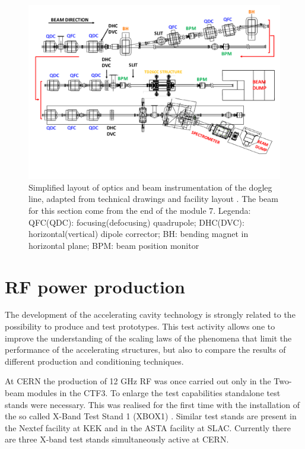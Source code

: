 \begin{landscape}
\begin{figure}
\centering 
\includegraphics[scale=0.78]{pictures/modified_pets.pdf}
\caption{Simplified layout of optics and beam instrumentation of the dogleg line, adapted from technical drawings and facility layout \cite{EDMS:CTF3}. The beam for this section come from the end of the module 7. Legenda: QFC(QDC): focusing(defocusing) quadrupole; DHC(DVC): horizontal(vertical) dipole corrector; BH: bending magnet in horizontal plane; BPM: beam position monitor}
\label{dolaut}
\end{figure}
\end{landscape}



\section[RF power production]{RF power production}

The development of the accelerating cavity technology is strongly related to the possibility to produce and test prototypes. This test activity allows one to improve the understanding of the scaling laws of the phenomena that limit the performance of the accelerating structures, but also to compare the results of different production and conditioning techniques. 

At CERN the production of 12 GHz RF was once carried out only in the Two-beam modules in the CTF3. To enlarge the test capabilities standalone test stands were necessary. This was realised for the first time with the installation of the so called X-Band Test Stand 1 (XBOX1) \cite{Peauger:1287901}. Similar test stands are present in the Nextef facility at KEK and in the ASTA facility at SLAC. Currently there are three X-band test stands simultaneously active at CERN.

